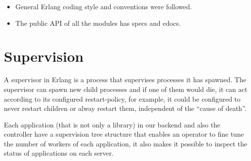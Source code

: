\documentclass[11pt,a4paper]{report}
\begin{document}
\begin{itemize}
\item General Erlang coding style and conventions were followed.
\item The public API of all the modules has specs and edocs.
\end{itemize}


\section{Supervision}
A supervisor in Erlang is a process that supervises processes it has spawned.
The supervisor can spawn new child processes and if one of them would die, it
can act according to its configured restart-policy, for example, it could be
configured to never restart children or alway restart them, independent of the
``cause of death''.

Each application (that is not only a library) in our backend and also the
controller have a supervision tree structure that enables an operator to fine
tune the number of workers of each application, it also makes it possible
to inspect the status of applications on each server.
\end{document}
